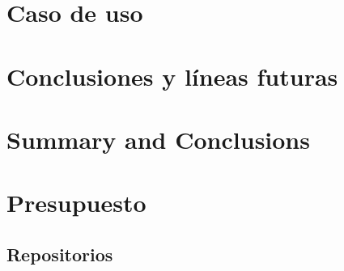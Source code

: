 \documentclass[spanish,a4paper,14pt,oneside]{extreport}
\begin{document}
\newpage{\pagestyle{empty}}
\thispagestyle{empty}

\chapter{Caso de uso}
\label{chapter:cuatro}




\newpage{\pagestyle{empty}}
\thispagestyle{empty}

\chapter{Conclusiones y líneas futuras}
\label{chapter:Conclusiones}



\newpage{\pagestyle{empty}}
\thispagestyle{empty}

\chapter{Summary and Conclusions}
\label{chapter:ingles}



\newpage{\pagestyle{empty}}
\thispagestyle{empty}

\chapter{Presupuesto}
\label{chapter:Presupuesto}




\newpage{\pagestyle{empty}}
\thispagestyle{empty}
\begin{appendix}

\chapter{Repositorios}
\label{appendix:1}


\end{appendix}




\nocite{*}

\end{document}

